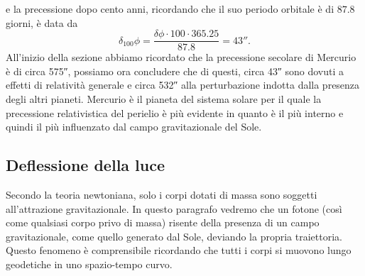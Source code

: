 e la precessione dopo cento anni, ricordando che il suo periodo orbitale è di
$87.8$ giorni, è data da
\begin{equation}
  \delta_{100}\phi = \frac{\delta\phi \cdot 100 \cdot 365.25}{87.8} =
  \ang{;;43}.
\end{equation}
All'inizio della sezione abbiamo ricordato che la precessione secolare di
Mercurio è di circa \ang{;;575}, possiamo ora concludere che di questi, circa
\ang{;;43} sono dovuti a effetti di relatività generale e circa \ang{;;532} alla
perturbazione indotta dalla presenza degli altri pianeti.  Mercurio è il pianeta
del sistema solare per il quale la precessione relativistica del perielio è più
evidente in quanto è il più interno e quindi il più influenzato dal campo
gravitazionale del Sole.

\subsection{Deflessione della luce}
\label{sec:deflessione-luce}

Secondo la teoria newtoniana, solo i corpi dotati di massa sono soggetti
all'attrazione gravitazionale.  In questo paragrafo vedremo che un fotone (così
come qualsiasi corpo privo di massa) risente della presenza di un campo
gravitazionale, come quello generato dal Sole, deviando la propria traiettoria.
Questo fenomeno è comprensibile ricordando che tutti i corpi si muovono lungo
geodetiche in uno spazio-tempo curvo.

